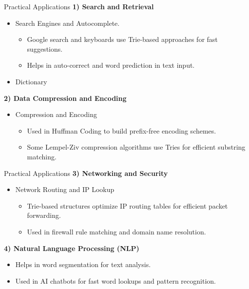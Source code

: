 \begin{frame}{Practical Applications}
    \textbf{1) Search and Retrieval}
\begin{itemize}
    \item Search Engines and Autocomplete.
    \begin{itemize}
        \item Google search and keyboards use Trie-based approaches for fast suggestions.
        \item Helps in auto-correct and word prediction in text input.
        \end{itemize}
    \item Dictionary
\end{itemize}

\textbf{2) Data Compression and Encoding}
\begin{itemize}
    \item Compression and Encoding
    \begin{itemize}
        \item Used in Huffman Coding to build prefix-free encoding schemes.
        \item Some Lempel-Ziv compression algorithms use Tries for efficient substring matching.
    \end{itemize}
\end{itemize}
\end{frame}
\begin{frame}{Practical Applications}
    \textbf{3) Networking and Security}
\begin{itemize}
    \item Network Routing and IP Lookup
    \begin{itemize}
        \item Trie-based structures optimize IP routing tables for efficient packet forwarding.
        \item Used in firewall rule matching and domain name resolution.
    \end{itemize}
\end{itemize}

\textbf{4) Natural Language Processing (NLP)}
\begin{itemize}
    \item Helps in word segmentation for text analysis.
    \item Used in AI chatbots for fast word lookups and pattern recognition.
\end{itemize}

\end{frame}

